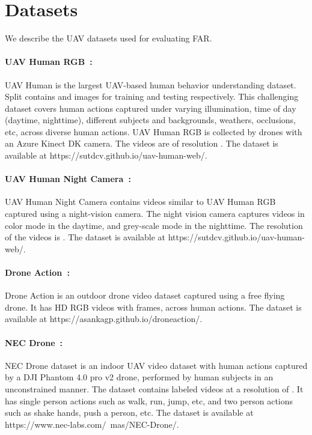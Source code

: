\documentclass[runningheads]{llncs}
\begin{document}
\section{Datasets}

We describe the UAV datasets used for evaluating FAR. 

\paragraph{UAV Human RGB~\cite{li2021uav}:} UAV Human is the largest UAV-based human behavior understanding dataset. Split  contains  and  images for training and testing respectively. This challenging dataset covers human actions captured under varying illumination, time of day (daytime, nighttime), different subjects and backgrounds, weathers, occlusions, etc, across  diverse human actions. UAV Human RGB is collected by drones with an Azure Kinect DK camera. The videos are of resolution . The dataset is available at  https://sutdcv.github.io/uav-human-web/. 

\paragraph{UAV Human Night Camera~\cite{li2021uav}:} UAV Human Night Camera contains videos similar to UAV Human RGB captured using a night-vision camera. The night vision camera captures videos in color mode in the daytime, and grey-scale mode in the nighttime. The resolution of the videos is . The dataset is available at  https://sutdcv.github.io/uav-human-web/. 


\paragraph{Drone Action~\cite{perera2019drone}:} Drone Action is an outdoor drone video dataset captured using a free flying drone. It has  HD RGB videos with  frames, across  human actions. The dataset is available at https://asankagp.github.io/droneaction/.

\paragraph{NEC Drone~\cite{choi2020unsupervised}:} NEC Drone dataset is an indoor UAV video dataset with  human actions captured by a DJI Phantom 4.0 pro v2 drone, performed by human subjects in an unconstrained manner. The dataset contains  labeled videos at a resolution of . It has  single person actions such as walk, run, jump, etc, and  two person actions such as shake hands, push a person, etc. The dataset is available at https://www.nec-labs.com/~mas/NEC-Drone/. 
\end{document}
